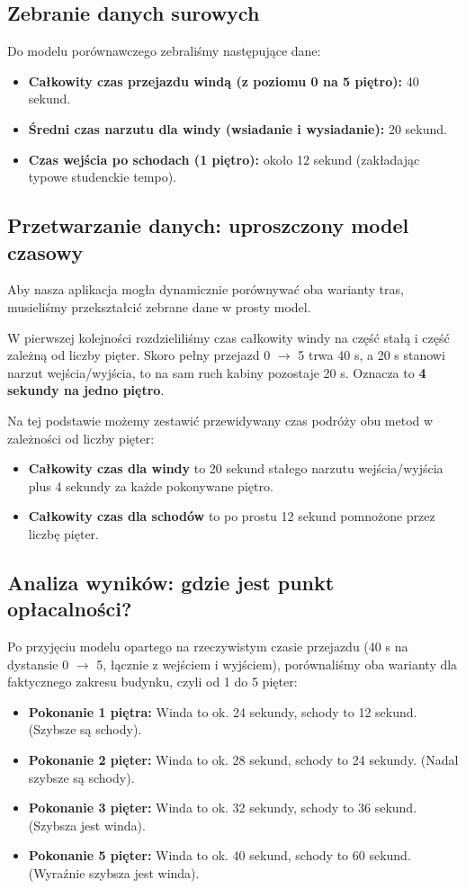 \documentclass[14pt,a4paper]{extarticle}
\begin{document}
\subsection{Zebranie danych surowych}
Do modelu porównawczego zebraliśmy następujące dane:
\begin{itemize}
    \item \textbf{Całkowity czas przejazdu windą (z poziomu 0 na 5 piętro):} 40 sekund.
    \item \textbf{Średni czas narzutu dla windy (wsiadanie i wysiadanie):} 20 sekund.
    \item \textbf{Czas wejścia po schodach (1 piętro):} około 12 sekund (zakładając typowe studenckie tempo).
\end{itemize}

\subsection{Przetwarzanie danych: uproszczony model czasowy}
Aby nasza aplikacja mogła dynamicznie porównywać oba warianty tras, musieliśmy przekształcić zebrane dane w prosty model.

W pierwszej kolejności rozdzieliliśmy czas całkowity windy na część stałą i część zależną od liczby pięter. Skoro pełny przejazd 0 $\rightarrow$ 5 trwa 40 s, a 20 s stanowi narzut wejścia/wyjścia, to na sam ruch kabiny pozostaje 20 s. Oznacza to \textbf{4 sekundy na jedno piętro}.

Na tej podstawie możemy zestawić przewidywany czas podróży obu metod w zależności od liczby pięter:
\begin{itemize}
    \item \textbf{Całkowity czas dla windy} to 20 sekund stałego narzutu wejścia/wyjścia plus 4 sekundy za każde pokonywane piętro.
    \item \textbf{Całkowity czas dla schodów} to po prostu 12 sekund pomnożone przez liczbę pięter.
\end{itemize}

\subsection{Analiza wyników: gdzie jest punkt opłacalności?}
Po przyjęciu modelu opartego na rzeczywistym czasie przejazdu (40 s na dystansie 0 $\rightarrow$ 5, łącznie z wejściem i wyjściem), porównaliśmy oba warianty dla faktycznego zakresu budynku, czyli od 1 do 5 pięter:

\begin{itemize}
    \item \textbf{Pokonanie 1 piętra:} Winda to ok. 24 sekundy, schody to 12 sekund. (Szybsze są schody).
    \item \textbf{Pokonanie 2 pięter:} Winda to ok. 28 sekund, schody to 24 sekundy. (Nadal szybsze są schody).
    \item \textbf{Pokonanie 3 pięter:} Winda to ok. 32 sekundy, schody to 36 sekund. (Szybsza jest winda).
    \item \textbf{Pokonanie 5 pięter:} Winda to ok. 40 sekund, schody to 60 sekund. (Wyraźnie szybsza jest winda).
\end{itemize}
\end{document}
